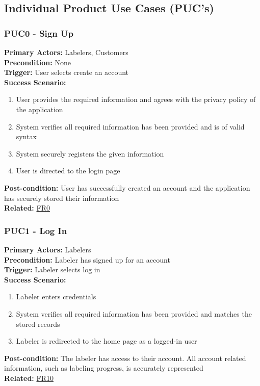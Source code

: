 \documentclass[12pt]{article}
\begin{document}
\subsection{Individual Product Use Cases (PUC's)}
\subsubsection*{PUC0 - Sign Up}
\label{sec:PUC0}
\textbf{Primary Actors:} Labelers, Customers\\ 
\textbf{Precondition:} None\\
\textbf{Trigger:} User selects create an account\\
\textbf{Success Scenario:}
\begin{enumerate}
    \item User provides the required information and agrees with the privacy policy of the application
    \item System verifies all required information has been provided and is of valid syntax
    \item System securely registers the given information
    \item User is directed to the login page
\end{enumerate}
\textbf{Post-condition:} User has successfully created an account and the application has securely stored their information\\
\textbf{Related:} \hyperref[sec:FR0]{FR0}

\subsubsection*{PUC1 - Log In}
\label{sec:PUC1}
\textbf{Primary Actors:} Labelers\\ 
\textbf{Precondition:} Labeler has signed up for an account\\
\textbf{Trigger:} Labeler selects log in\\
\textbf{Success Scenario:}
\begin{enumerate}
    \item Labeler enters credentials
    \item System verifies all required information has been provided and matches the stored records
    \item Labeler is redirected to the home page as a logged-in user
\end{enumerate}
\textbf{Post-condition:} The labeler has access to their account. All account related information, such as labeling progress, is accurately represented\\
\textbf{Related:} \hyperref[sec:FR10]{FR10}
\end{document}
